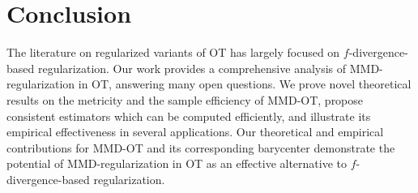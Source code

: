 \section{Conclusion}\label{sec:conclusion}
The literature on regularized variants of OT has largely focused on $f$-divergence-based regularization. Our work provides a comprehensive analysis of MMD-regularization in OT, answering many open questions. We prove novel theoretical results on the metricity and the sample efficiency of MMD-OT, propose consistent estimators which can be computed efficiently, and illustrate its empirical effectiveness in several applications. Our theoretical and empirical contributions for MMD-OT and its corresponding barycenter demonstrate the potential of MMD-regularization in OT  as an effective alternative to $f$-divergence-based regularization. 
